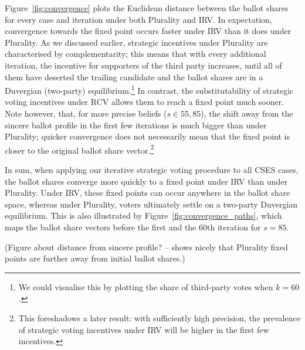 \documentclass[12pt, letter]{article}
\begin{document}
Figure~\ref{fig:convergence} plots the Euclidean distance between the ballot shares for every case and iteration under both Plurality and IRV. In expectation, convergence towards the fixed point occurs faster under IRV than it does under Plurality. As we discussed earlier, strategic incentives under Plurality are characterised by complementarity; this means that with every additional iteration, the incentive for supporters of the third party increases, until all of them have deserted the trailing candidate and the ballot shares are in a Duvergian (two-party) equilibrium.\footnote{We could visualise this by plotting the share of third-party votes when $k = 60$.} In contrast, the substitutability of strategic voting incentives under RCV allows them to reach a fixed point much sooner. Note however, that, for more precise beliefs ($s \in {55, 85}$), the shift away from the sincere ballot profile in the first few iterations is much bigger than under Plurality; quicker convergence does not necessarily mean that the fixed point is closer to the original ballot share vector.\footnote{This foreshadows a later result: with sufficiently high precision, the prevalence of strategic voting incentives under IRV will be higher in the first few incentives.}

In sum, when applying our iterative strategic voting procedure to all CSES cases, the ballot shares converge more quickly to a fixed point under IRV than under Plurality. Under IRV, these fixed points can occur anywhere in the ballot share space, whereas under Plurality, voters ultimately settle on a two-party Duvergian equilibrium. This is also illustrated by Figure~\ref{fig:convergence_paths}, which maps the ballot share vectors before the first and the 60th iteration for $s = 85$.

(Figure about distance from sincere profile? -- shows nicely that Plurality fixed points are further away from initial ballot shares.)
\end{document}
